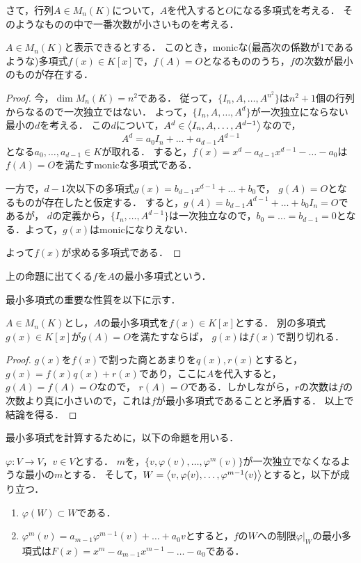 さて，行列$A \in M_n(K)$について，$A$を代入すると$O$になる多項式を考える．
そのようなものの中で一番次数が小さいものを考える．
\begin{prop}
    $A \in M_n(K)$と表示できるとする．
    このとき，monicな(最高次の係数が1であるような)多項式$f(x) \in K[x]$で，$f(A)=O$となるもののうち，$f$の次数が最小のものが存在する．
\end{prop}
\begin{proof}
    今，$\dim M_n(K)=n^2$である．
    従って，$\{I_n,A,\dots,A^{n^2}\}$は$n^2+1$個の行列からなるので一次独立ではない．
    よって，$\{I_n,A,\dots,A^d\}$が一次独立にならない最小の$d$を考える．
    この$d$について，$A^d \in \left\langle I_n,A,\dots,A^{d-1} \right\rangle$なので，
    \[
        A^d = a_0 I_n + \dots + a_{d-1} A^{d-1}
    \]
    となる$a_0,\dots,a_{d-1}\in K$が取れる．
    すると，$f(x)=x^d-a_{d-1}x^{d-1}-\dots-a_0$は$f(A)=O$を満たすmonicな多項式である．

    一方で，$d-1$次以下の多項式$g(x) = b_{d-1}x^{d-1} + \dots + b_0$で，
    $g(A)=O$となるものが存在したと仮定する．
    すると，$g(A)=b_{d-1}A^{d-1}+\dots+b_0I_n = O$であるが，
    $d$の定義から，$\{I_n,\dots,A^{d-1}\}$は一次独立なので，$b_0=\dots=b_{d-1}=0$となる．よって，$g(x)$はmonicになりえない．

    よって$f(x)$が求める多項式である．
\end{proof}
\begin{dfn}
    上の命題に出てくる$f$を$A$の最小多項式という．
\end{dfn}
最小多項式の重要な性質を以下に示す．
\begin{prop}\label{prop:ideal}
    $A \in M_n(K)$とし，$A$の最小多項式を$f(x) \in K[x]$とする．
    別の多項式$g(x) \in K[x]$が$g(A)=O$を満たすならば，
    $g(x)$は$f(x)$で割り切れる．
\end{prop}
\begin{proof}
    $g(x)$を$f(x)$で割った商とあまりを$q(x),r(x)$とすると，
    $g(x)=f(x)q(x)+r(x)$であり，ここに$A$を代入すると，$g(A)=f(A)=O$なので，
    $r(A)=O$である．しかしながら，$r$の次数は$f$の次数より真に小さいので，これは$f$が最小多項式であることと矛盾する．
    以上で結論を得る．
\end{proof}
最小多項式を計算するために，以下の命題を用いる．
\begin{prop}
    $\varphi\colon V \to V$，$v \in V$とする．
    $m$を，$\{v,\varphi(v),\dots,\varphi^m(v)\}$が一次独立でなくなるような最小の$m$とする．
    そして，$W=\left\langle v,\varphi(v),\dots,\varphi^{m-1}(v) \right\rangle$とすると，以下が成り立つ．
    \begin{enumerate}
        \item $\varphi(W)\subset W$である．
        \item $\varphi^m(v)=a_{m-1}\varphi^{m-1}(v) + \dots + a_0 v$とすると，$f$の$W$への制限$\varphi|_W$の最小多項式は$F(x) = x^m-a_{m-1}x^{m-1}-\dots-a_0$である．
    \end{enumerate}
\end{prop}
